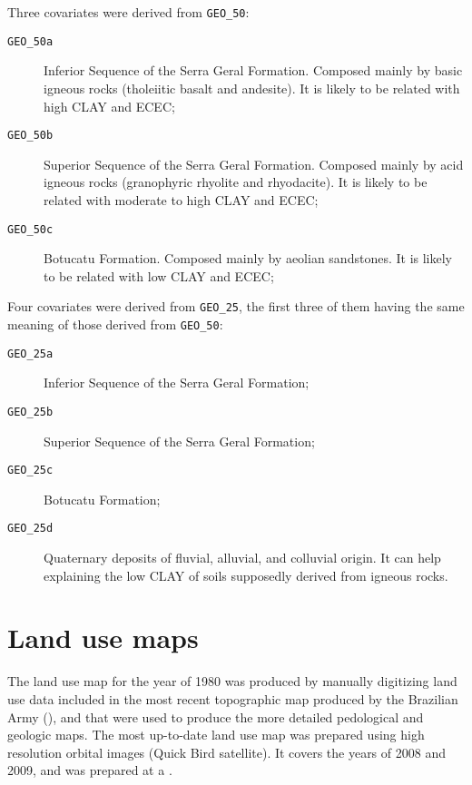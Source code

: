 Three covariates were derived from \texttt{GEO\_50}:

\begin{description}
 \item[\texttt{GEO\_50a}] Inferior Sequence of the Serra Geral Formation. Composed mainly by basic 
 igneous rocks (tholeiitic basalt and andesite). It is likely to be related with high CLAY and 
 ECEC;
 
 \item[\texttt{GEO\_50b}] Superior Sequence of the Serra Geral Formation. Composed mainly by acid 
 igneous rocks (granophyric rhyolite and rhyodacite). It is likely to be related with moderate to 
 high CLAY and ECEC;
 
 \item[\texttt{GEO\_50c}] Botucatu Formation. Composed mainly by aeolian sandstones. It is likely 
 to be related with low CLAY and ECEC;
\end{description}

Four covariates were derived from \texttt{GEO\_25}, the first three of them having the same meaning 
of those derived from \texttt{GEO\_50}:

\begin{description}
 \item[\texttt{GEO\_25a}] Inferior Sequence of the Serra Geral Formation;
 
 \item[\texttt{GEO\_25b}] Superior Sequence of the Serra Geral Formation;
 
 \item[\texttt{GEO\_25c}] Botucatu Formation;
 
 \item[\texttt{GEO\_25d}] Quaternary deposits of fluvial, alluvial, and colluvial 
 origin. It can help explaining the low CLAY of soils supposedly derived from igneous rocks.
\end{description}

\tocless\section{Land use maps}
\label{sec:covar-data-land-use}

The land use map for the year of \num{1980} was produced by manually digitizing land use data included in the 
most recent topographic map produced by the Brazilian Army (), and that were used to produce the 
more detailed pedological and geologic maps. The most up-to-date land use map was prepared using high 
resolution orbital images (Quick Bird satellite). It covers the years of \num{2008} and \num{2009}, and was 
prepared at a  \cite{SamuelRosaEtAl2011a}.

